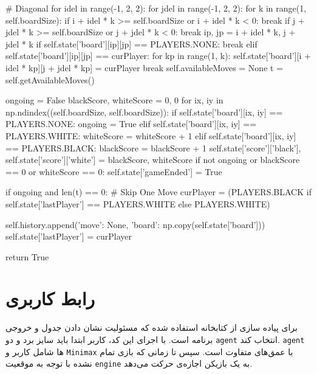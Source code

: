 \begin{latin}
\begin{python}
        # Diagonal
        for idel in range(-1, 2, 2):
            for jdel in range(-1, 2, 2):
                for k in range(1, self.boardSize):
                    if i + idel * k >= self.boardSize or i + idel * k < 0:
                        break
                    if j + jdel * k >= self.boardSize or j + jdel * k < 0:
                        break
                    ip, jp = i + idel * k, j + jdel * k
                    if self.state['board'][ip][jp] == PLAYERS.NONE:
                        break
                    elif self.state['board'][ip][jp] == curPlayer:
                        for kp in range(1, k):
                            self.state['board'][i + idel * kp][j + jdel * kp] = curPlayer
                        break
        self.availableMoves = None
        t = self.getAvailableMoves()
        
        ongoing = False
        blackScore, whiteScore = 0, 0
        for ix, iy in np.ndindex((self.boardSize, self.boardSize)):
            if self.state['board'][ix, iy] == PLAYERS.NONE:
                ongoing = True
            elif self.state['board'][ix, iy] == PLAYERS.WHITE:
                whiteScore = whiteScore + 1
            elif self.state['board'][ix, iy] == PLAYERS.BLACK:
                blackScore = blackScore + 1
        self.state['score']['black'], self.state['score']['white'] = blackScore, whiteScore
        if not ongoing or blackScore == 0 or whiteScore == 0:
            self.state['gameEnded'] = True

        if ongoing and len(t) == 0:
            # Skip One Move
            curPlayer = (PLAYERS.BLACK if 
                    self.state['lastPlayer'] == PLAYERS.WHITE else PLAYERS.WHITE)

            self.history.append({'move': None, 'board': np.copy(self.state['board'])})
            self.state['lastPlayer'] = curPlayer

        return True

\end{python}
\end{latin}

\section{رابط کاربری }
برای پیاده سازی 
از کتابخانه
استفاده شده که مسئولیت نشان دادن جدول و خروجی برنامه است.
با اجرای این  کد، کاربر ابتدا باید سایز برد و دو 
\verb;agent;
انتخاب کند.
\verb;agent;
ها شامل کاربر و 
\verb;Minimax;
با عمق‌های متفاوت است.
سپس تا زمانی که بازی تمام نشده با توجه به موقعیت
\verb;engine;
به یک بازیکن اجازه‌ی حرکت می‌دهد.

